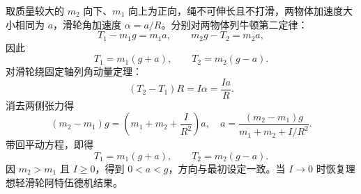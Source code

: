 取质量较大的 $m_2$ 向下、$m_1$ 向上为正向，绳不可伸长且不打滑，两物体加速度大小相同为 $a$，滑轮角加速度 $\alpha=a/R$。分别对两物体列牛顿第二定律：
\[
T_1-m_1g=m_1a,\qquad m_2g-T_2=m_2a,
\]
因此
\[
T_1=m_1(g+a),\qquad T_2=m_2(g-a).
\]
对滑轮绕固定轴列角动量定理：
\[
(T_2-T_1)R=I\alpha=\frac{Ia}{R}.
\]
消去两侧张力得
\[
(m_2-m_1)g=\left(m_1+m_2+\frac{I}{R^2}\right)a,
\quad
\boxed{a=\frac{(m_2-m_1)g}{m_1+m_2+I/R^2}}.
\]
带回平动方程，即得
\[
\boxed{T_1=m_1(g+a)},\qquad\boxed{T_2=m_2(g-a)}.
\]
因 $m_2>m_1$ 且 $I\geq0$，得到 $0<a<g$，方向与最初设定一致。当 $I\to0$ 时恢复理想轻滑轮阿特伍德机结果。
